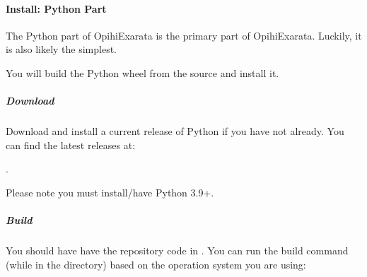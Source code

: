 \documentclass[letterpaper,11pt,english]{sphinxmanual}
\begin{document}
\begin{sphinxVerbatim}[commandchars=\\\{\}]
   
 
  
 
\end{sphinxVerbatim}

\sphinxstepscope


\paragraph{Install: Python Part}
\label{\detokenize{technical/installation/python:install-python-part}}\label{\detokenize{technical/installation/python:technical-installation-python-part}}\label{\detokenize{technical/installation/python::doc}}
\sphinxAtStartPar
The Python part of OpihiExarata is the primary part of OpihiExarata. Luckily,
it is also likely the simplest.

\sphinxAtStartPar
You will build the Python wheel from the source and install it.


\subparagraph{Download}
\label{\detokenize{technical/installation/python:download}}
\sphinxAtStartPar
Download and install a current release of Python if you have not already. You
can find the latest releases at: %
\begin{footnote}[28]\sphinxAtStartFootnote
{}
%
\end{footnote}.

\sphinxAtStartPar
Please note you must install/have Python 3.9+.


\subparagraph{Build}
\label{\detokenize{technical/installation/python:build}}
\sphinxAtStartPar
You should have have the repository code in . You can
run the build command (while in the directory) based on the operation system
you are using:
\end{document}
